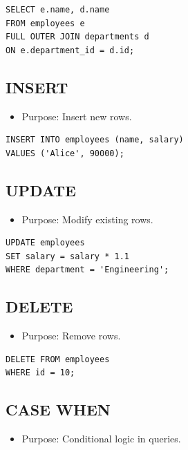 \documentclass[10pt]{article}
\begin{document}
\begin{verbatim}
SELECT e.name, d.name
FROM employees e
FULL OUTER JOIN departments d
ON e.department_id = d.id;
\end{verbatim}

\subsection{INSERT}
\begin{itemize}
    \item Purpose: Insert new rows.
\end{itemize}

\begin{verbatim}
INSERT INTO employees (name, salary)
VALUES ('Alice', 90000);
\end{verbatim}

\subsection{UPDATE}
\begin{itemize}
    \item Purpose: Modify existing rows.
\end{itemize}

\begin{verbatim}
UPDATE employees
SET salary = salary * 1.1
WHERE department = 'Engineering';
\end{verbatim}

\subsection{DELETE}
\begin{itemize}
    \item Purpose: Remove rows.
\end{itemize}

\begin{verbatim}
DELETE FROM employees
WHERE id = 10;
\end{verbatim}

\subsection{CASE WHEN}
\begin{itemize}
    \item Purpose: Conditional logic in queries.
\end{itemize}
\end{document}

